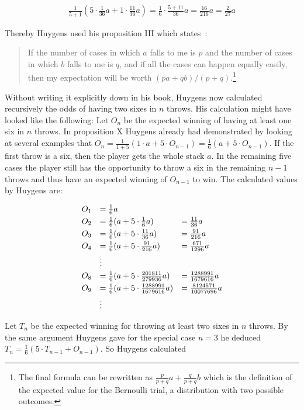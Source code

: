 \begin{align}
  \frac{1}{5+1} \left(5 \cdot \frac 1{36} a + 1 \cdot \frac{11}{36} a \right) = \frac{1}{6} \cdot \frac{5+11}{36} a = \frac{16}{216} a = \frac{2}{27} a
\end{align}

\noindent Thereby Huygens used his proposition III which states~\cite[p. 135]{bernoulli}:

\begin{quotation}
  If the number of cases in which $a$ falls to me is $p$ and the number of cases in which $b$ falls to me is $q$, and if all the cases can happen equally easily, then my expectation will be worth $(pa+qb)/(p+q)$.\footnote{The final formula can be rewritten as $\tfrac{p}{p+q} a+\tfrac q{p+q} b$ which is the definition of the expected value for the Bernoulli trial, a distribution with two possible outcomes. }
\end{quotation}

Without writing it explicitly down in his book, Huygens now calculated recursively the odds of having two sixes in $n$ throws. His calculation might have looked like the following: Let $O_n$ be the expected winning of having at least one six in $n$ throws. In proposition X Huygens already had demonstrated by looking at several examples that $O_n = \tfrac 1{1+5} \left( 1 \cdot a + 5 \cdot O_{n-1} \right)=\tfrac 16 \left( a + 5 \cdot O_{n-1} \right)$. If the first throw is a six, then the player gets the whole stack $a$. In the remaining five cases the player still has the opportunity to throw a six in the remaining $n-1$ throws and thus have an expected winning of $O_{n-1}$ to win. The calculated values by Huygens are:

\begin{align}
  \begin{array}{rll}
    O_1 & = \frac 16 a \nl
    O_2 & = \frac 16 ( a + 5 \cdot \frac 16 a) & = \frac{11}{36} a \nl
    O_3 & = \frac 16 ( a + 5 \cdot \frac{11}{36} a) & = \frac{91}{216} a \nl
    O_4 & = \frac 16 ( a + 5 \cdot \frac{91}{216} a) & = \frac{671}{1296} a \nl
    & \vdots \nl
    O_8 & = \frac 16 ( a + 5 \cdot \frac{201811}{279936} a) & = \frac{1288991}{1679616} a \nl
    O_9 & = \frac 16 ( a + 5 \cdot \frac{1288991}{1679616} a) & = \frac{8124571}{10077696} a \nl
    & \vdots
  \end{array}
\end{align}

Let $T_n$ be the expected winning for throwing at least two sixes in $n$ throws. By the same argument Huygens gave for the special case $n=3$ he deduced $T_n = \tfrac{1}{6} ( 5 \cdot T_{n-1}  + O_{n-1})$. So Huygens calculated

